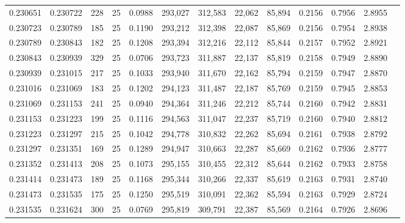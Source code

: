 \begin{tabular}{rrrrrrrrrrrrr}
0.230651 & 0.230722 &   228 &  25 &                                     0.0988 & 293,027 & 312,583 &  22,062 &  85,894 & 0.2156 & 0.7956 & 2.8955 \\
0.230723 & 0.230789 &   185 &  25 &                                     0.1190 & 293,212 & 312,398 &  22,087 &  85,869 & 0.2156 & 0.7954 & 2.8938 \\
0.230789 & 0.230843 &   182 &  25 &                                     0.1208 & 293,394 & 312,216 &  22,112 &  85,844 & 0.2157 & 0.7952 & 2.8921 \\
0.230843 & 0.230939 &   329 &  25 &                                     0.0706 & 293,723 & 311,887 &  22,137 &  85,819 & 0.2158 & 0.7949 & 2.8890 \\
0.230939 & 0.231015 &   217 &  25 &                                     0.1033 & 293,940 & 311,670 &  22,162 &  85,794 & 0.2159 & 0.7947 & 2.8870 \\
0.231016 & 0.231069 &   183 &  25 &                                     0.1202 & 294,123 & 311,487 &  22,187 &  85,769 & 0.2159 & 0.7945 & 2.8853 \\
0.231069 & 0.231153 &   241 &  25 &                                     0.0940 & 294,364 & 311,246 &  22,212 &  85,744 & 0.2160 & 0.7942 & 2.8831 \\
0.231153 & 0.231223 &   199 &  25 &                                     0.1116 & 294,563 & 311,047 &  22,237 &  85,719 & 0.2160 & 0.7940 & 2.8812 \\
0.231223 & 0.231297 &   215 &  25 &                                     0.1042 & 294,778 & 310,832 &  22,262 &  85,694 & 0.2161 & 0.7938 & 2.8792 \\
0.231297 & 0.231351 &   169 &  25 &                                     0.1289 & 294,947 & 310,663 &  22,287 &  85,669 & 0.2162 & 0.7936 & 2.8777 \\
0.231352 & 0.231413 &   208 &  25 &                                     0.1073 & 295,155 & 310,455 &  22,312 &  85,644 & 0.2162 & 0.7933 & 2.8758 \\
0.231414 & 0.231473 &   189 &  25 &                                     0.1168 & 295,344 & 310,266 &  22,337 &  85,619 & 0.2163 & 0.7931 & 2.8740 \\
0.231473 & 0.231535 &   175 &  25 &                                     0.1250 & 295,519 & 310,091 &  22,362 &  85,594 & 0.2163 & 0.7929 & 2.8724 \\
0.231535 & 0.231624 &   300 &  25 &                                     0.0769 & 295,819 & 309,791 &  22,387 &  85,569 & 0.2164 & 0.7926 & 2.8696 \\

\end{tabular}
